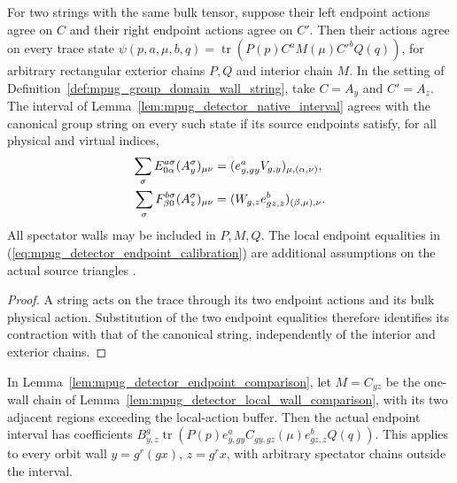 \begin{lemma}
    \label{lem:mpug_detector_endpoint_comparison}
    For two strings with the same bulk tensor, suppose their left
    endpoint actions agree on $C$ and their right endpoint actions agree
    on $C'$. Then their actions agree on every trace state
    $\psi(p,a,\mu,b,q)=\operatorname{tr}(P(p)C^aM(\mu)C'^bQ(q))$,
    for arbitrary rectangular exterior chains $P,Q$ and interior chain $M$.
    In the setting of Definition~\ref{def:mpug_group_domain_wall_string},
    take $C=A_y$ and $C'=A_z$. The interval of
    Lemma~\ref{lem:mpug_detector_native_interval} agrees with the canonical
    group string on every such state if its source endpoints satisfy,
    for all physical and virtual indices,
    \begin{align}
        \sum_{\sigma}E^{a\sigma}_{0\alpha}(A_y^{\sigma})_{\mu\nu}
         & =(e_{y,gy}^aV_{g,y})_{\mu,(\alpha,\nu)},\notag \\
        \sum_{\sigma}F^{b\sigma}_{\beta0}(A_z^{\sigma})_{\mu\nu}
         & =(W_{g,z}e_{gz,z}^b)_{(\beta,\mu),\nu}.
        \label{eq:mpug_detector_endpoint_calibration}
    \end{align}
    All spectator walls may be included in $P,M,Q$. The local endpoint
    equalities in (\ref{eq:mpug_detector_endpoint_calibration}) are
    additional assumptions on the actual source triangles
    \cite{gap:gs24_truncation_detector_endpoint_dependence}.
\end{lemma}

\begin{proof}
    A string acts on the trace through its two endpoint actions and its
    bulk physical action. Substitution of the two endpoint equalities
    therefore identifies its contraction with that of the canonical
    string, independently of the interior and exterior chains.
\end{proof}

\begin{lemma}
    \label{lem:mpug_detector_native_wall_step}
    In Lemma~\ref{lem:mpug_detector_endpoint_comparison}, let
    $M=C_{yz}$ be the one-wall chain of
    Lemma~\ref{lem:mpug_detector_local_wall_comparison}, with its two
    adjacent regions exceeding the local-action buffer. Then the actual
    endpoint interval has coefficients
    $B^g_{y,z}\operatorname{tr}(P(p)e_{y,gy}^aC_{gy,gz}(\mu)e_{gz,z}^bQ(q))$.
    This applies to every orbit wall $y=g^r(gx)$, $z=g^rx$, with
    arbitrary spectator chains outside the interval.
\end{lemma}

